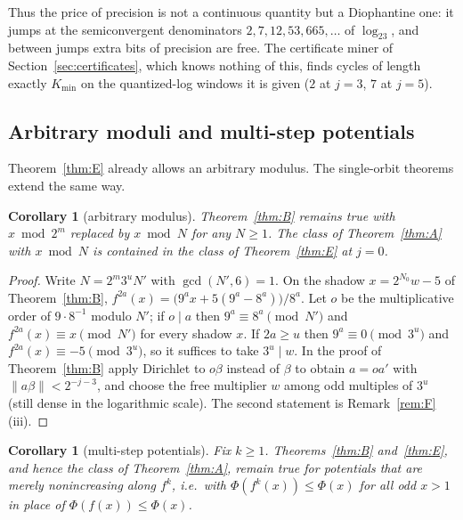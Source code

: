 \documentclass[11pt]{article}
\newtheorem{corollary}[theorem]{Corollary}
\theoremstyle{definition}
\theoremstyle{remark}
\begin{document}
Thus the price of precision is not a continuous quantity but a Diophantine
one: it jumps at the semiconvergent denominators $2,7,12,53,665,\dots$ of
$\log_23$, and between jumps extra bits of precision are free. The
certificate miner of Section~\ref{sec:certificates}, which knows nothing
of this, finds cycles of length exactly $K_{\min}$ on the quantized-log
windows it is given ($2$ at $j=3$, $7$ at $j=5$).

\subsection*{Arbitrary moduli and multi-step potentials}

Theorem~\ref{thm:E} already allows an arbitrary modulus. The single-orbit
theorems extend the same way.

\begin{corollary}[arbitrary modulus]\label{cor:modulus}
Theorem~\ref{thm:B} remains true with $x\bmod2^{m}$ replaced by
$x\bmod N$ for any $N\ge1$. The class of Theorem~\ref{thm:A} with
$x\bmod N$ is contained in the class of Theorem~\ref{thm:E} at $j=0$.
\end{corollary}

\begin{proof}
Write $N=2^{m}3^{u}N'$ with $\gcd(N',6)=1$. On the shadow
$x=2^{N_0}w-5$ of Theorem~\ref{thm:B},
$f^{2a}(x)=\bigl(9^{a}x+5(9^{a}-8^{a})\bigr)/8^{a}$. Let $o$ be the
multiplicative order of $9\cdot8^{-1}$ modulo $N'$; if $o\mid a$ then
$9^{a}\equiv8^{a}\pmod{N'}$ and $f^{2a}(x)\equiv x\pmod{N'}$ for every
shadow $x$. If $2a\ge u$ then $9^{a}\equiv0\pmod{3^{u}}$ and
$f^{2a}(x)\equiv-5\pmod{3^{u}}$, so it suffices to take $3^{u}\mid w$.
In the proof of Theorem~\ref{thm:B} apply Dirichlet to $o\beta$ instead of
$\beta$ to obtain $a=oa'$ with $\|a\beta\|<2^{-j-3}$, and choose the
free multiplier $w$ among odd multiples of $3^{u}$ (still dense in the
logarithmic scale). The second statement is Remark~\ref{rem:F}(iii).
\end{proof}

\begin{corollary}[multi-step potentials]\label{cor:multistep}
Fix $k\ge1$. Theorems~\ref{thm:B} and~\ref{thm:E}, and hence the class of
Theorem~\ref{thm:A}, remain true for potentials that are merely
nonincreasing along $f^{k}$, i.e.\ with $\Phi(f^{k}(x))\le\Phi(x)$ for all
odd $x>1$ in place of $\Phi(f(x))\le\Phi(x)$.
\end{corollary}
\end{document}
